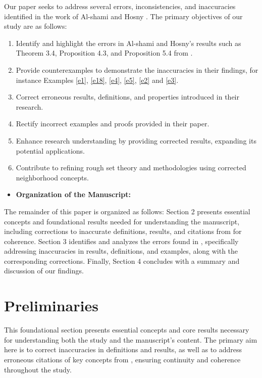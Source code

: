 \documentclass{article}
\theoremstyle{theorem}
\theoremstyle{definition}
\theoremstyle{remark}
\begin{document}
Our paper seeks to address several errors, inconsistencies, and inaccuracies identified in the work of Al-shami and Hosny \cite{Al-shami 2024}. The primary objectives of our study are as follows:
\begin{enumerate}
  \item Identify and highlight the errors in Al-shami and Hosny’s results such as Theorem 3.4, Proposition 4.3, and Proposition 5.4 from \cite{Al-shami 2024}.
  \item Provide counterexamples to demonstrate the inaccuracies in their findings, for instance Examples \ref{e1}, \ref{e18}, \ref{e4}, \ref{e5}, \ref{e2} and \ref{e3}.
  \item Correct erroneous results, definitions, and properties introduced in their research.
  \item Rectify incorrect examples and proofs provided in their paper.
  \item Enhance research understanding by providing corrected results, expanding its potential applications.
  \item Contribute to refining rough set theory and methodologies using corrected neighborhood concepts.
\end{enumerate}

\begin{itemize}
  \item \textbf{Organization of the Manuscript:}
\end{itemize}

The remainder of this paper is organized as follows: Section 2 presents essential concepts and foundational  results needed for understanding the manuscript, including corrections to inaccurate definitions, results, and citations from \cite{Al-shami 2024} for coherence. Section 3 identifies and analyzes the errors found in \cite{Al-shami 2024}, specifically addressing inaccuracies in results, definitions, and examples, along with the corresponding corrections. Finally, Section 4 concludes with a summary and discussion of our findings.

\section{Preliminaries}

This foundational section presents essential concepts and core results necessary for understanding both the study and the manuscript’s content. The primary aim here is to correct inaccuracies in definitions and results, as well as to address erroneous citations of key concepts from \cite{Al-shami 2024}, ensuring continuity and coherence throughout the study.\\
\end{document}

